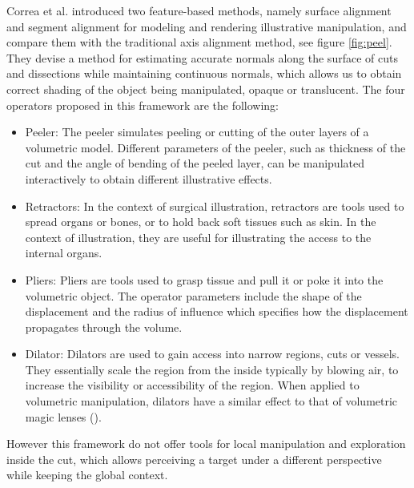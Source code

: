  Correa et al. introduced two feature-based methods, namely surface alignment and segment alignment for modeling and rendering illustrative manipulation, and compare them with the traditional axis alignment method, see figure \ref{fig:peel}. They devise a method for estimating accurate normals along the surface of cuts
and dissections while maintaining continuous normals, which allows
us to obtain correct shading of the object being manipulated, opaque
or translucent. The four operators proposed in this framework are the following:
\begin{itemize}
\item Peeler: The peeler simulates peeling or cutting of the outer layers
of a volumetric model. Different parameters
of the peeler, such as thickness of the cut and the angle of bending of
the peeled layer, can be manipulated interactively to obtain different
illustrative effects.
\item Retractors: In the context of surgical illustration, retractors are tools used to spread organs or bones, or to hold back soft tissues such as
skin. In the context of illustration, they are useful for illustrating the
access to the internal organs.
\item Pliers: Pliers are tools used to grasp tissue and pull it or poke it into the volumetric object. The operator parameters include the shape of
the displacement and the radius of influence which specifies how the
displacement propagates through the volume.
\item Dilator: Dilators are used to gain access into narrow regions, cuts
or vessels. They essentially scale the region from the inside typically
by blowing air, to increase the visibility or accessibility of the region.
When applied to volumetric manipulation, dilators have a similar effect
to that of volumetric magic lenses (\cite{1532818}).
\end{itemize} 
However this framework do not offer tools for local manipulation and exploration inside the cut, which allows perceiving a target under a different perspective while keeping the global context. 


